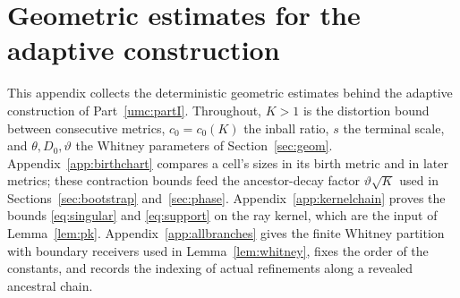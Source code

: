 \documentclass[11pt]{article}
\theoremstyle{definition}
\theoremstyle{remark}
\numberwithin{equation}{section}
\begin{document}
\section{Geometric estimates for the adaptive construction}\label{app:geometry}

This appendix collects the deterministic geometric estimates behind
the adaptive construction of Part~\ref{umc:partI}. Throughout, $K>1$
is the distortion bound between consecutive metrics, $c_0=c_0(K)$ the
inball ratio, $s$ the terminal scale, and $\theta,D_0,\vartheta$ the
Whitney parameters of Section~\ref{sec:geom}. Appendix~\ref{app:birthchart}
compares a cell's sizes in its birth metric and in later metrics;
these contraction bounds feed the ancestor-decay factor
$\vartheta\sqrt K$ used in Sections~\ref{sec:bootstrap}
and~\ref{sec:phase}. Appendix~\ref{app:kernelchain} proves the bounds
\eqref{eq:singular} and \eqref{eq:support} on the ray kernel, which
are the input of Lemma~\ref{lem:pk}. Appendix~\ref{app:allbranches}
gives the finite Whitney partition with boundary receivers used in
Lemma~\ref{lem:whitney}, fixes the order of the constants, and records
the indexing of actual refinements along a revealed ancestral chain.
\end{document}
